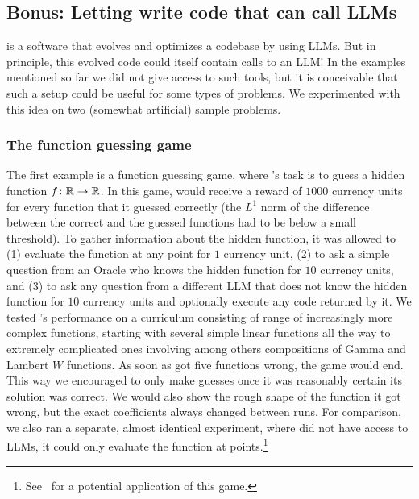 \subsection{Bonus: Letting \AlphaEvolve write code that can call LLMs}

\AlphaEvolve is a software that evolves and optimizes a codebase by using LLMs. But in principle, this evolved code could itself contain calls to an LLM! In the examples mentioned so far we did not give \AlphaEvolve access to such tools, but it is conceivable that such a setup could be useful for some types of problems.  We experimented with this idea on two (somewhat artificial) sample problems.
 






  \subsubsection{The function guessing game}
\href{https://google-deepmind.github.io/alphaevolve_repository_of_problems/problems/66.html}{\faLink}

The first example is a function guessing game, where \AlphaEvolve's task is to guess a hidden function $f \colon \mathbb{R}\rightarrow \mathbb{R}$. In this  game, \AlphaEvolve would receive a reward of $1000$ currency units for every function that it guessed correctly (the $L^1$ norm of the difference between the correct and the guessed functions had to be below a small threshold). To gather information about the hidden function, it was allowed to (1) evaluate the function at any point for $1$ currency unit, (2) to ask a simple question from an Oracle who knows the hidden function for $10$ currency units, and (3) to ask any question from a different LLM that does not know the hidden function for $10$ currency units and optionally execute any code returned by it. We tested \AlphaEvolve's performance on a curriculum consisting of range of increasingly more complex functions, starting with several simple linear functions all the way to extremely complicated ones involving among others compositions of Gamma and Lambert $W$ functions. As soon as \AlphaEvolve got five functions wrong, the game would end. This way we encouraged \AlphaEvolve to only make guesses once it was reasonably certain its solution was correct. We would also show \AlphaEvolve the rough shape of the function it got wrong, but the exact coefficients always changed between runs. For comparison, we also ran a separate, almost identical  experiment, where \AlphaEvolve did not have access to LLMs, it could only evaluate the function at points.\footnote{See~\cite{radchenko2019fourier} for a potential application of this game.}


